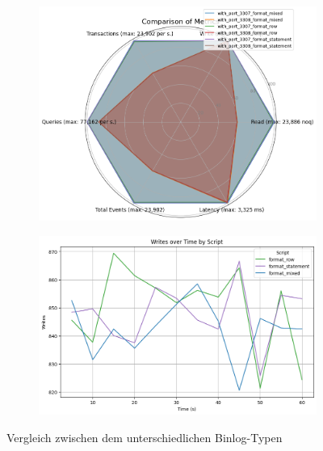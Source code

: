 \begin{figure}[H]
  \centering
  \begin{subfigure}[t]{0.48\textwidth}
    \includegraphics[width=\textwidth]{PNGs/Script/Replication/replication-format-change/statistics}
  \end{subfigure}
  \hfill
  \begin{subfigure}[t]{0.48\textwidth}
    \includegraphics[width=\textwidth]{PNGs/Script/Replication/replication-format-change/Writes}
  \end{subfigure}
  \vspace{-20pt}
  \caption[Replikation: Unterschiedlichen Binlog-Typen]{Vergleich zwischen dem unterschiedlichen Binlog-Typen }
  \label{fig:replication-format-change}
\end{figure}
\vspace{-20pt}

